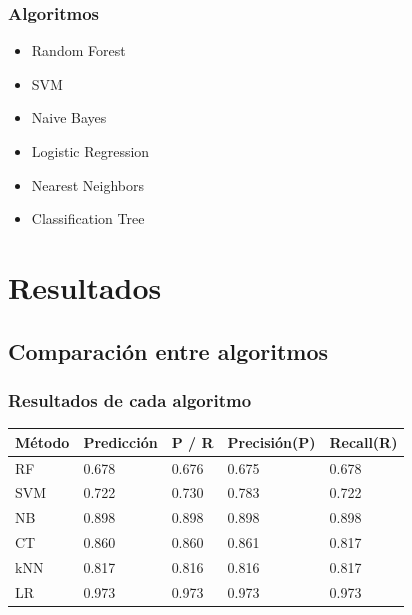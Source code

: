 \documentclass{beamer}
\begin{document}
\begin{frame}
\frametitle{Algoritmos}
\begin{itemize}
\item Random Forest
\item SVM
\item Naive Bayes
\item Logistic Regression
\item Nearest Neighbors
\item Classification Tree
\end{itemize}
\end{frame}

\section{Resultados} %

\subsection{Comparaci\'{o}n entre algoritmos} %

\begin{frame}
\frametitle{Resultados de cada algoritmo}
\begin{table}
\begin{center}
\begin{tabular}{ | p{2 cm} | p{2 cm} | p{2 cm} | p{2 cm} | p{2 cm} | }
\toprule
\textbf{M\'{e}todo} & \textbf{Predicci\'{o}n} & \textbf{ P / R } & \textbf{Precisi\'{o}n(P)} & \textbf{Recall(R)}\\
\midrule
RF & 0.678 & 0.676 & 0.675 & 0.678\\ \hline
SVM & 0.722 & 0.730 & 0.783 & 0.722\\ \hline
NB & 0.898 & 0.898 & 0.898  & 0.898\\ \hline 
CT & 0.860 & 0.860 & 0.861 & 0.817\\ \hline
kNN & 0.817 & 0.816 & 0.816 & 0.817\\ \hline 
LR & 0.973 & 0.973 & 0.973 & 0.973\\ 
\bottomrule
\end{tabular}
\end{center}
\end{table}
\end{frame}
\end{document}
